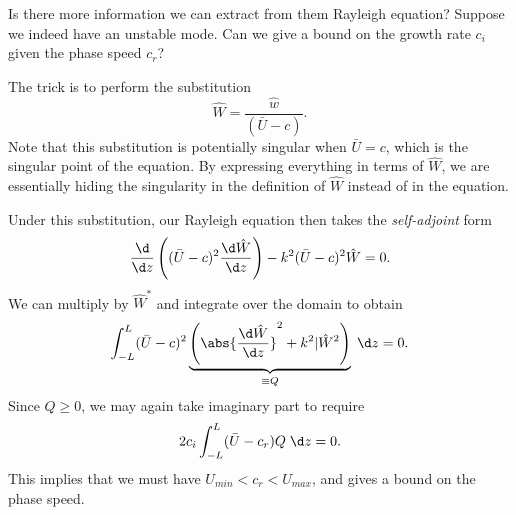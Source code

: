 \documentclass[a4paper]{article}
\begin{document}
Is there more information we can extract from them Rayleigh equation? Suppose we indeed have an unstable mode. Can we give a bound on the growth rate $c_i$ given the phase speed $c_r$?

The trick is to perform the substitution
\[
  \hat{W} = \frac{\hat{w}}{(\bar{U} - c)}.
\]
Note that this substitution is potentially singular when $\bar{U} = c$, which is the singular point of the equation. By expressing everything in terms of $\hat{W}$, we are essentially hiding the singularity in the definition of $\hat{W}$ instead of in the equation.

Under this substitution, our Rayleigh equation then takes the \emph{self-adjoint} form
\[
  \frac{\d}{\d z} \left((\bar{U} - c)^2 \frac{\d \hat{W}}{\d z}\right) - k^2 (\bar{U} - c)^2 \hat{W} = 0.
\]
We can multiply by $\hat{W}^*$ and integrate over the domain to obtain
\[
  \int_{-L}^L (\bar{U} - c)^2 \underbrace{\left(\abs{\frac{\d \hat{W}}{\d z}}^2 + k^2 |\hat{W}^2\right)}_{\equiv Q}\;\d z = 0.
\]
Since $Q \geq 0$, we may again take imaginary part to require
\[
  2 c_i \int_{-L}^L (\bar{U} - c_r) Q \;\d z = 0.
\]
This implies that we must have $U_{min} < c_r < U_{max}$, and gives a bound on the phase speed.
\end{document}
